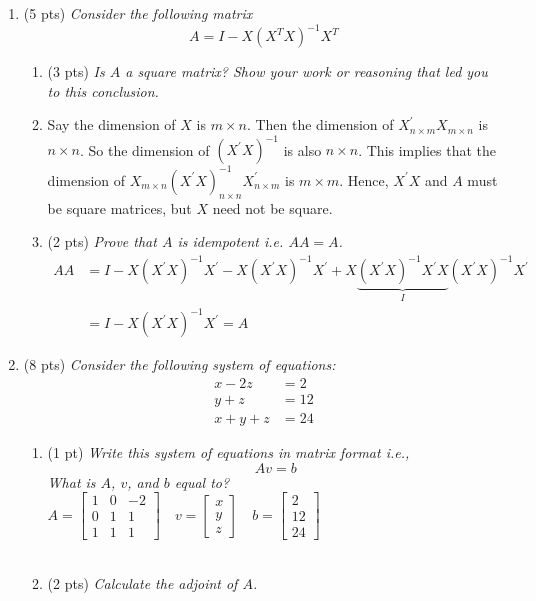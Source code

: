 \documentclass{./../../latex/tests}
\begin{document}
\begin{enumerate}
\newpage
\item (5 pts) \textit{Consider the following matrix \[A = I - X(X^T X)^{-1}X^T \]}
\begin{enumerate}
\item (3 pts)  \textit{Is $A$ a square matrix? Show your work or reasoning that led you to this conclusion.}
\item[] Say the dimension of $X$ is \( m \times n \). Then the dimension of \( X_{n \times m}^{\prime} X_{m \times n} \) is \( n \times n \). So the dimension of \( \left(X^{\prime} X\right)^{-1} \) is also  \( n \times n \).  This implies that the dimension of \( X_{m \times n}\left(X^{\prime} X\right)_{n \times n}^{-1} X_{n \times m}^{\prime} \) is \( m \times m \). Hence, \( X^{\prime} X \) and $A$ must be square matrices, but $X$ need not be square. \\
\item (2 pts) \textit{Prove that $A$ is idempotent i.e. $A A = A$.} 
\[
\begin{aligned}
A A &=I-X\left(X^{\prime} X\right)^{-1} X^{\prime}-X\left(X^{\prime} X\right)^{-1} X^{\prime}+X\underbrace{\left(X^{\prime} X\right)^{-1} X^{\prime} X}_{I}\left(X^{\prime} X\right)^{-1} X^{\prime} \\
&=I-X\left(X^{\prime} X\right)^{-1} X^{\prime} = A
\end{aligned}
\]
\end{enumerate} 

\vspace{1cm}

\item (8 pts) \textit{Consider the following system of equations:
}\begin{align*}
x-2z & = 2 \\
y+z & = 12 \\
x+y+z &= 24	
\end{align*}
\begin{enumerate}
  \item (1 pt) \textit{Write this system of equations in matrix format i.e., \[ Av=b \]
  What is $A$, $v$, and $b$ equal to?} \\
  
  $A=\left[\begin{array}{rrr}1 & 0 & -2 \\ 0 & 1 & 1 \\ 1 & 1 & 1\end{array}\right] \quad v=\left[\begin{array}{l}x \\ y \\ z\end{array}\right] \quad b=\left[\begin{array}{c}2 \\ 12 \\ 24\end{array}\right]$ \\~\\
   \item (2 pts) \textit{Calculate the adjoint of $A$. } \\
   

\end{enumerate}
\end{enumerate}
\end{document}
